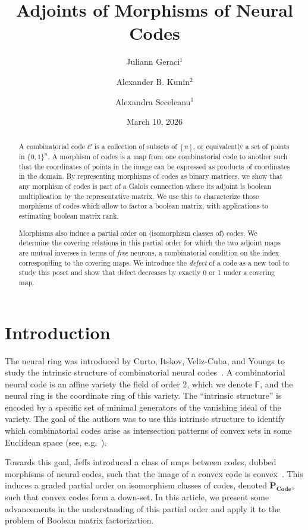 \documentclass[11pt,letterpaper, reqno]{amsart}
\title{Adjoints of Morphisms of Neural Codes}
\author{Juliann Geraci$^1$}
\author{Alexander B. Kunin$^{2}$}
\author{Alexandra Seceleanu$^1$}
\date{March 10, 2026}
\theoremstyle{definition}
\def\F{\mathbb{F}}
\def\cC{\mathcal{C}}
\def\pcode{\mathbf{P_{Code}}}
\begin{document}
\begin{abstract} 
A combinatorial code $\cC$ is a collection of subsets of $[n]$, or equivalently a set of points in $\{0,1\}^n$.
    A morphism of codes is a map from one combinatorial code to another such that the coordinates of points in the image can be expressed as products of coordinates in the domain.
    By representing morphisms of codes as binary matrices, we show that any morphism of codes is part of a Galois connection where its adjoint is boolean multiplication by the representative matrix. We use this to characterize those morphisms of codes which allow to factor a boolean matrix, with applications to estimating boolean matrix rank. 
    
    Morphisms also induce a partial order on (isomorphism classes of) codes.
    We determine the covering relations in this partial order for which the two adjoint maps are mutual inverses in terms of \emph{free} neurons, a combinatorial condition on the index corresponding to the covering maps.
    We introduce the \emph{defect} of a code as a new tool to study this poset and show that defect decreases by exactly 0 or 1 under a covering map.
\end{abstract}
\maketitle

\setcounter{tocdepth}{1}
\tableofcontents


\section{Introduction}

The neural ring was introduced by Curto, Itskov, Veliz-Cuba, and Youngs to study the intrinsic structure of combinatorial neural codes~\cite{neuralring13}.
A combinatorial neural code is an affine variety the field of order 2, which we denote $\F$, and the neural ring is the coordinate ring of this variety.
The ``intrinsic structure'' is encoded by a specific set of minimal generators of the vanishing ideal of the variety. The goal of the authors was to use this intrinsic structure to identify which combinatorial codes arise as intersection patterns of convex sets in some Euclidean space (see, e.g.~\cites{curto2017whatconvex, curto2019algebraic}).

Towards this goal, Jeffs introduced a class of maps between codes, dubbed morphisms of neural codes, such that the image of a convex code is convex~\cite{morphisms}. This induces a graded partial order on isomorphism classes of codes, denoted $\pcode$, such that convex codes form a down-set.
In this article, we present some advancements in the understanding of this partial order and apply it to the problem of Boolean matrix factorization.
\end{document}
